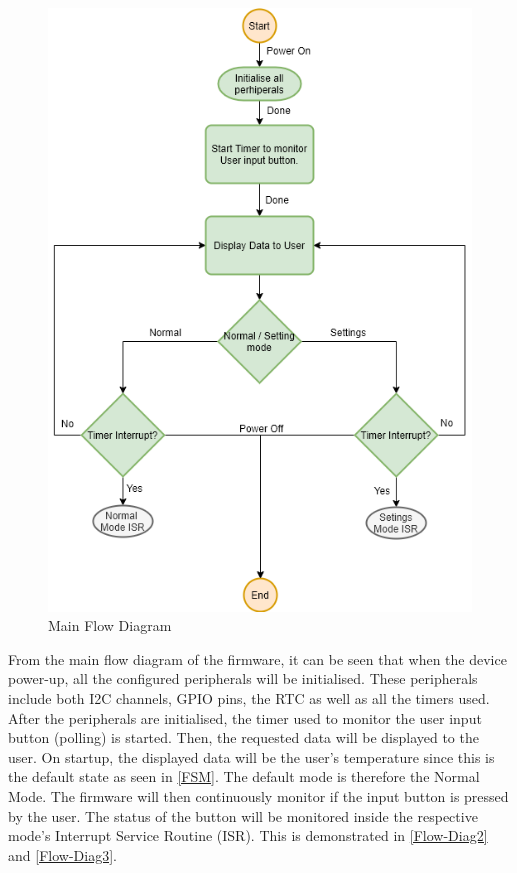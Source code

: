 \begin{figure}[H]
	\centering
	\includegraphics[scale=0.5]{img/Flow-Diag1.png}
	\caption{Main Flow Diagram}
	\label{Flow-Diag1}
\end{figure}
\noindent
From the main flow diagram of the firmware, it can be seen that when the device power-up, all the configured peripherals will be initialised. These peripherals include both I2C channels, GPIO pins, the RTC as well as all the timers used. After the peripherals are initialised, the timer used to monitor the user input button (polling) is started. Then, the requested data will be displayed to the user. On startup, the displayed data will be the user's temperature since this is the default state as seen in \autoref{FSM}. The default mode is therefore the Normal Mode. The firmware will then continuously monitor if the input button is pressed by the user. The status of the button will be monitored inside the respective mode's Interrupt Service Routine (ISR). This is demonstrated in \autoref{Flow-Diag2} and \autoref{Flow-Diag3}.
